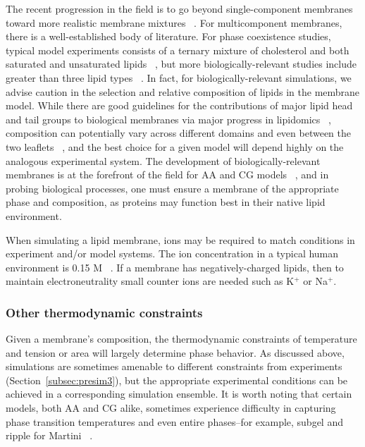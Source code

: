 \documentclass[9pt,bestpractices,pubversion]{livecoms}
\begin{document}
The recent progression in the field is to go beyond single-component membranes toward more realistic membrane mixtures ~\cite{Khakbaz2015}.
For multicomponent membranes, there is a well-established body of literature.
For phase coexistence studies, typical model experiments consists of a ternary mixture of cholesterol and both saturated and unsaturated lipids ~\cite{Berkowitz2009}, but more biologically-relevant studies include greater than three lipid types ~\cite{Khakbaz2015}.
In fact, for biologically-relevant simulations, we advise caution in the selection and relative composition of lipids in the membrane model.
While there are good guidelines for the contributions of major lipid head and tail groups to biological membranes via major progress in lipidomics ~\cite{VanMeer2008,Sampaio2011}, composition can potentially vary across different domains and even between the two leaflets ~\cite{Ing??lfsson2014}, and the best choice for a given model will depend highly on the analogous experimental system.
The development of biologically-relevant membranes is at the forefront of the field for AA and CG models  ~\cite{Khakbaz2015,Monje-Galvan2015}, and in probing biological processes, one must ensure a membrane of the appropriate phase and composition, as proteins may function best in their native lipid environment.

When simulating a lipid membrane, ions may be required to match conditions in experiment and/or model systems.
The ion concentration in a typical human environment is 0.15 M ~\cite{Lodish2000}.
If a membrane has negatively-charged lipids, then to maintain electroneutrality small counter ions are needed such as K$^+$ or Na$^+$.

\subsubsection{Other thermodynamic constraints}
\label{subsubsec:constraints}
Given a membrane's composition, the thermodynamic constraints of temperature and tension or area will largely determine phase behavior.
As discussed above, simulations are sometimes amenable to different constraints from experiments (Section~\ref{subsec:presim3}), but the appropriate experimental conditions can be achieved in a corresponding simulation ensemble.
It is worth noting that certain models, both AA and CG alike, sometimes experience difficulty in capturing phase transition temperatures and even entire phases--for example, subgel and ripple for Martini ~\cite{Rodgers2012,Pluhackova2016}.
\end{document}
